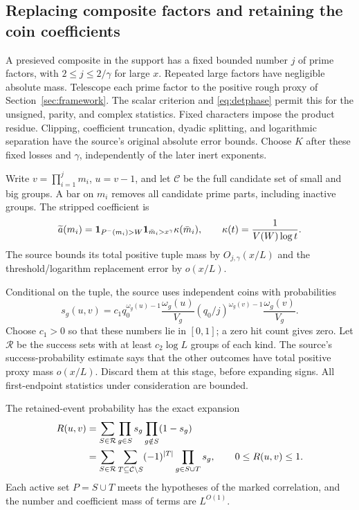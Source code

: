\subsection{Replacing composite factors and retaining the coin coefficients}

A presieved composite in the support has a fixed bounded number
$j$ of prime factors, with $2\leq j\leq2/\gamma$ for large $x$.
Repeated large factors have negligible absolute mass.
Telescope each prime factor to the positive rough proxy of
Section~\ref{sec:framework}. The scalar criterion and
\eqref{eq:detphase} permit this for the unsigned, parity, and
complex statistics. Fixed characters impose the product residue.
Clipping, coefficient truncation, dyadic splitting, and logarithmic
separation have the source's original absolute error bounds.
Choose $K$ after these fixed losses and $\gamma$, independently of
the later inert exponents.

Write $v=\prod_{i=1}^jm_i$, $u=v-1$, and let $\mathcal C$ be the
full candidate set of small and big groups. A bar on $m_i$ removes
all candidate prime parts, including inactive groups. The stripped
coefficient is
\[
 \widetilde a(m_i)=\mathbf 1_{P^-(m_i)>W}
     \mathbf 1_{\bar m_i>x^\gamma}\kappa(\bar m_i),
 \qquad \kappa(t)=\frac1{V(W)\log t}.
\]
The source bounds its total positive tuple mass by
$O_{j,\gamma}(x/L)$ and the threshold/logarithm replacement error
by $o(x/L)$.

Conditional on the tuple, the source uses independent coins with
probabilities
\begin{equation}\label{eq:coins}
 s_g(u,v)=c_1q_0^{\omega_g(u)-1}\frac{\omega_g(u)}{V_g}
              (q_0/j)^{\omega_g(v)-1}\frac{\omega_g(v)}{V_g}.
\end{equation}
Choose $c_1>0$ so that these numbers lie in $[0,1]$; a zero hit
count gives zero. Let $\mathcal R$ be the success sets with at least
$c_2\log L$ groups of each kind. The source's success-probability
estimate says that the other outcomes have total positive proxy
mass $o(x/L)$. Discard them at this stage, before expanding signs.
All first-endpoint statistics under consideration are bounded.

The retained-event probability has the exact expansion
\begin{align}\label{eq:coinexpand}
 R(u,v)
 &=\sum_{S\in\mathcal R}\prod_{g\in S}s_g
                     \prod_{g\notin S}(1-s_g)\notag\\
 &=\sum_{S\in\mathcal R}\sum_{T\subseteq\mathcal C\setminus S}
                  (-1)^{|T|}\prod_{g\in S\cup T}s_g,
 \qquad 0\leq R(u,v)\leq1.
\end{align}
Each active set $P=S\cup T$ meets the hypotheses of the marked
correlation, and the number and coefficient mass of terms are
$L^{O(1)}$.

